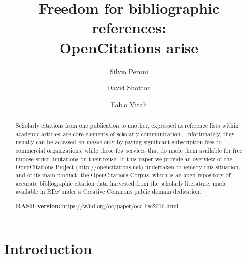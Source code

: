 \documentclass[runningheads,a4paper]{llncs}
\begin{document}
\mainmatter

\title{Freedom for bibliographic references:\\ OpenCitations arise}
\author{Silvio Peroni \and
David Shotton \and
Fabio Vitali}
\maketitle

\begin{abstract}
Scholarly citations from one publication to another, expressed as reference lists within academic articles, are core elements of scholarly communication. Unfortunately, they usually can be accessed {\em en masse }only by paying significant subscription fees to commercial organizations, while those few services that do made them available for free impose strict limitations on their reuse. In this paper we provide an overview of the OpenCitations Project (\url{http://opencitations.net}) undertaken to remedy this situation, and of its main product, the OpenCitations Corpus, which is an open repository of accurate bibliographic citation data harvested from the scholarly literature, made available in RDF under a Creative Commons public domain dedication.

{\bf RASH version:} \url{https://w3id.org/oc/paper/occ-lisc2016.html}

\end{abstract}


\section{Introduction}
\end{document}
